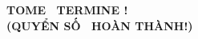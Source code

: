 \documentclass[14pt, a4paper]{book}
\begin{document}





\vfill %
\begin{center}
	\textcolor{vol}
    {\quincy\Huge\textbf{TOME \ TERMINE !} \\[1ex]
    \vnmdisp\Huge\textbf{(QUYỂN SỐ \ HOÀN THÀNH!)}}
\end{center}
\end{document}
